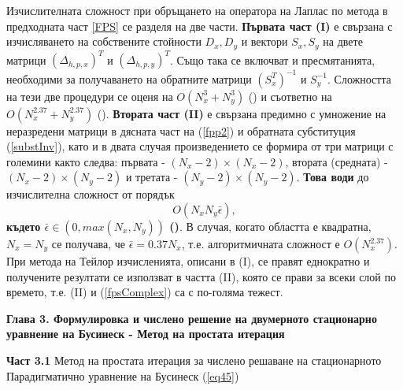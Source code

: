 \documentclass[a5paper]{article}
\newcommand{\be}{\begin{equation}}
\newcommand{\ee}{\end{equation}}
\newcommand{\rf}[1]{(\ref{#1})}
\theoremstyle{remark}
\begin{document}
\begin{normalsize}
Изчислителната сложност при обръщането на оператора на Лаплас по метода в предходната част \ref{FPS} се разделя на две части. \textbf{ Първата част (I)} е свързана с изчисляването на собствените стойности $D_x, D_y$ и вектори $S_x, S_y$ на двете матрици $(\Delta_{h,p,x})^T$ и $(\Delta_{h,p,y})^T$. Също така се включват и пресмятанията, необходими за получаването на обратните матрици $(S_x^T)^{-1}$ и $S_y^{-1}$. Сложността на тези две процедури се оценя на $O(N_x^3+N_y^3)$ (\cite{ref260}) и съответно на $O(N_x^{2.37}+N_y^{2.37})$ (\cite{ref27}). \textbf{Втората част (II)} е свързана предимно с умножение на неразредени матрици в дясната част на \rf{fpp2} и обратната субституция \rf{substInv}, като и в двата случая произведението се формира от три матрици  с големини както следва: първата - $(N_x-2) \times (N_x-2)$, втората (средната) - $(N_x-2) \times (N_y-2)$ и третата - $(N_y-2) \times (N_y-2)$. \textbf{Това води} до изчислителна сложност от порядък
\be\label{fpsComplex}
O(N_x N_y \bar{\epsilon}),
\ee
\textbf{където $\bar{\epsilon} \in (0, max(N_x, N_y))$ (\cite{ref26, ref27})}. В случая, когато областта е квадратна, $N_x = N_y$ се получава, че $\bar{\epsilon} = 0.37 N_x$, т.е. алгоритмичната сложност е $O(N_x^{2.37})$. При метода на Тейлор изчисленията, описани в (I), се правят еднократно и получените резултати се използват в частта (II), която се прави за всеки слой по времето, т.е. (II) и \rf{fpsComplex} са с по-голяма тежест. 
\fi

\vspace{0.5cm}
\textbf{Глава 3. Формулировка и числено решение на двумерното стационарно уравнение на Бусинеск - Метод на простата итерация}

\textbf{Част 3.1} Метод на простата итерация за числено решаване на стационарното Парадигматично уравнение на Бусинеск \rf{eq45}


\end{normalsize}
\end{document}
